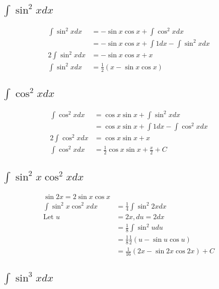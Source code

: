 \documentclass[letterpaper]{article}
\begin{document}
\subsection{\(\int \sin^2 x dx\)}
\label{sec:org09ed916}

\[\begin{aligned}
   \int \sin  ^2 x dx &= - \sin  x \cos  x +\int \cos  ^2 x dx\\
   &= - \sin  x \cos  x +\int 1 dx -\int  \sin  ^2 x dx\\
   2\int \sin ^2 x dx &= - \sin  x \cos  x + x\\
   \int \sin ^2 x dx  &= \frac{1}{2} (x-\sin  x \cos  x)
   \end{aligned}\]

\subsection{\(\int \cos^2 x  dx\)}
\label{sec:org331006c}

\[\begin{aligned}
   \int \cos  ^2 x dx &= \cos  x \sin  x + \int \sin^2 x dx\\
   &= \cos x \sin  x + \int 1 dx - \int \cos^2 x dx\\
   2\int \cos  ^2 x dx &= \cos  x \sin  x + x\\
   \int \cos  ^2 x dx &= \frac{1}{2}\cos  x \sin  x + \frac{x}{2}+C
   \end{aligned}\]

\subsection{\(\int \sin^2 x\cos^2 x dx\)}
\label{sec:org00cfeb4}


\[\begin{aligned}
   \sin  2 x = 2 \sin  x \cos  x\\
   \int \sin  ^2 x \cos  ^2 x dx &= \frac{1}{4}\int \sin  ^2 2 x dx\\
   \text{Let } u &= 2x, du = 2 dx\\
   &= \frac{1}{8}\int \sin  ^2 u du\\
   &= \frac{1}{8} \frac{1}{2}  (u-\sin  u \cos  u)\\
   &= \frac{1}{16} (2x - \sin  2x \cos  2x)+C
   \end{aligned}\]

\subsection{\(\int \sin^3 x dx\)}
\label{sec:org98d1bac}
\end{document}

